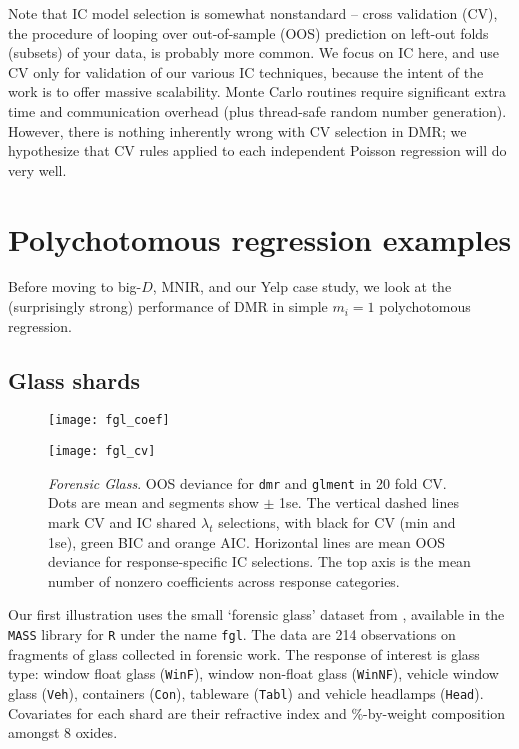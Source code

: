 \documentclass[12pt]{article}
\newcommand{\cd}[1]{{\tt#1}}
\begin{document}
Note that IC model selection is somewhat nonstandard  -- cross validation
(CV), the procedure of looping over out-of-sample (OOS) prediction on 
left-out folds (subsets) of your data, is probably more common.  We focus on IC here, and use CV only for validation of our various IC techniques, because the intent of the work is to offer massive scalability. Monte Carlo routines require significant extra time and communication overhead (plus thread-safe random number generation).  However, there is  nothing inherently wrong with CV selection in DMR; we hypothesize that CV rules applied to each independent Poisson regression will do very well.

\section{Polychotomous regression examples}
\label{M1}

Before moving to big-$D$, MNIR, and our Yelp case study, we look at the
(surprisingly strong) performance of DMR in simple $m_i=1$ polychotomous
regression.

\subsection{Glass shards}
\label{FGL}


\begin{figure}
\texttt{[image: fgl\_coef]}
\caption{\label{fgl_coef} {\it Forensic Glass}. Regularization paths for each glass-type response category.  AIC and BIC selections are marked with dashed vertical lines (orange and green respectively; they overlap for \cd{Tabl}).}
\vskip 1cm
\texttt{[image: fgl\_cv]}
\caption{\label{fgl_cv}  {\it Forensic Glass}. OOS deviance for \cd{dmr} and \cd{glment} in 20 fold CV.  Dots are mean and segments show $\pm$ 1se.  The vertical dashed lines mark CV and IC shared $\lambda_t$ selections, with black for CV (min and 1se), green BIC and orange AIC. Horizontal lines are mean OOS deviance for response-specific IC selections. The top axis is the mean number of nonzero coefficients across response categories.}
\end{figure}

Our first illustration uses the small `forensic glass' dataset from
\citet{venables_modern_2002}, available in the \cd{MASS} library for \cd{R}
under the name \cd{fgl}.  The data are 214 observations on fragments of glass
collected in forensic work. The response of interest is glass type: window
float glass (\cd{WinF}), window non-float glass (\cd{WinNF}), vehicle window
glass (\cd{Veh}), containers (\cd{Con}), tableware (\cd{Tabl}) and vehicle
headlamps (\cd{Head}).  Covariates for each shard are their refractive index
and \%-by-weight composition amongst 8 oxides.
\end{document}
